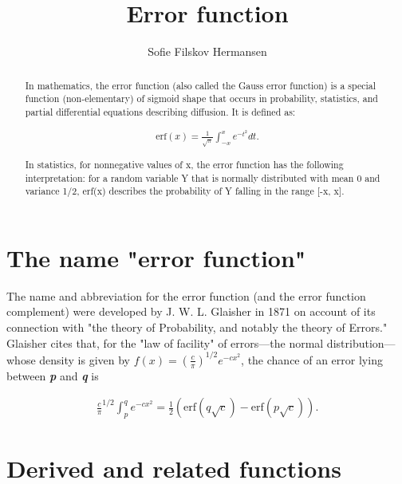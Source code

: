 \documentclass[a4paper]{article}
\title{Error function}
\author{Sofie Filskov Hermansen}
\date{}
\begin{document}
\maketitle

\begin{abstract}
In mathematics, the error function (also called the Gauss error function) is a special function (non-elementary) of sigmoid shape that occurs in probability, statistics, and partial differential equations describing diffusion. It is defined as:

\begin{align}
\text{erf}(x) = \frac{1}{\sqrt{\pi}} \int_{-x}^x e^{-t^2} dt.
\end{align}

In statistics, for nonnegative values of x, the error function has the following interpretation: for a random variable Y that is normally distributed with mean 0 and variance 1/2, erf(x) describes the probability of Y falling in the range [-x, x].

\end{abstract}

\section{The name "error function"}
The name and abbreviation for the error function (and the error function complement) were developed by J. W. L. Glaisher in 1871 on account of its connection with "the theory of Probability, and notably the theory of Errors." Glaisher cites that, for the "law of facility" of errors—the normal distribution—whose density is given by $f(x) = \left( \frac{c}{\pi}\right)^{1/2} e^{-cx^2}$, the chance of an error lying between \textit{\textbf{p}} and \textit{\textbf{q}} is

\begin{align}
\frac{c}{\pi}^{1/2} \int_p^q e^{-cx^2} = \frac{1}{2} (\text{erf}(q\sqrt{c})-\text{erf}(p\sqrt{c})).
\end{align}

\section{Derived and related functions}
\end{document}
